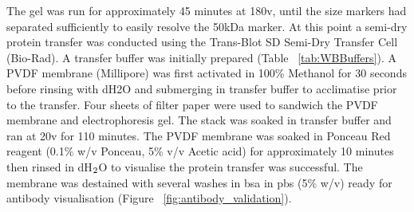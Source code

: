 The gel was run for approximately 45 minutes at 180v, until the size markers had separated sufficiently to easily resolve the 50kDa marker. At this point a semi-dry protein transfer was conducted using the Trans-Blot SD Semi-Dry Transfer Cell (Bio-Rad). A transfer buffer was initially prepared (Table ~\ref{tab:WBBuffers}). A PVDF membrane (Millipore) was first activated in 100\% Methanol for 30 seconds before rinsing with dH2O and submerging in transfer buffer to acclimatise prior to the transfer. Four sheets of filter paper were used to sandwich the PVDF membrane and electrophoresis gel. The stack was soaked in transfer buffer and ran at 20v for 110 minutes. The PVDF membrane was soaked in Ponceau Red reagent (0.1\% w/v Ponceau, 5\% v/v Acetic acid) for approximately 10 minutes then rinsed in dH$\textsubscript{2}$O to visualise the protein transfer was successful. The membrane was destained with several washes in \acrfull{bsa} in \acrfull{pbs} (5\% w/v) ready for antibody visualisation (Figure ~\ref{fig:antibody_validation}).


